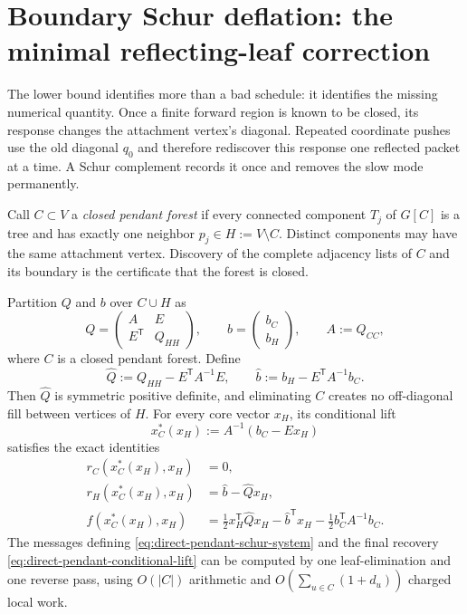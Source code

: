 \section{Boundary Schur deflation: the minimal reflecting-leaf correction}
\label{sec:direct-boundary-deflation}

The lower bound identifies more than a bad schedule: it identifies the
missing numerical quantity.  Once a finite forward region is known to be
closed, its response changes the attachment vertex's diagonal.  Repeated
coordinate pushes use the old diagonal $q_0$ and therefore rediscover this
response one reflected packet at a time.  A Schur complement records it
once and removes the slow mode permanently.

Call $C\subset V$ a \emph{closed pendant forest} if every connected
component $T_j$ of $G[C]$ is a tree and has exactly one neighbor
$p_j\in H:=V\setminus C$.  Distinct components may have the same attachment
vertex.  Discovery of the complete adjacency lists of $C$ and its boundary
is the certificate that the forest is closed.

\begin{theorem}
\label{thm:direct-pendant-deflation}
Partition $Q$ and $b$ over $C\cup H$ as
\begin{equation*}
 Q=\begin{pmatrix}A&E\\ E^\mathsf T&Q_{HH}\end{pmatrix},
 \qquad
 b=\begin{pmatrix}b_C\\b_H\end{pmatrix},
 \qquad A:=Q_{CC},
\end{equation*}
where $C$ is a closed pendant forest.  Define
\begin{equation}
 \widehat Q:=Q_{HH}-E^\mathsf TA^{-1}E,
 \qquad
 \widehat b:=b_H-E^\mathsf TA^{-1}b_C.
 \label{eq:direct-pendant-schur-system}
\end{equation}
Then $\widehat Q$ is symmetric positive definite, and eliminating $C$
creates no off-diagonal fill between vertices of $H$.  For every core vector
$x_H$, its conditional lift
\begin{equation}
 x_C^*(x_H):=A^{-1}(b_C-Ex_H)
 \label{eq:direct-pendant-conditional-lift}
\end{equation}
satisfies the exact identities
\begin{align}
 r_C(x_C^*(x_H),x_H)&=0,\label{eq:direct-pendant-zero-residual}\\
 r_H(x_C^*(x_H),x_H)&=\widehat b-\widehat Qx_H,
 \label{eq:direct-pendant-reduced-residual}\\
 f(x_C^*(x_H),x_H)
 &=\frac12x_H^\mathsf T\widehat Qx_H-\widehat b^\mathsf Tx_H
   -\frac12b_C^\mathsf TA^{-1}b_C.
 \label{eq:direct-pendant-objective-identity}
\end{align}
The messages defining \cref{eq:direct-pendant-schur-system} and the final
recovery \cref{eq:direct-pendant-conditional-lift} can be computed by one
leaf-elimination and one reverse pass, using $O(|C|)$ arithmetic and
$O(\sum_{u\in C}(1+d_u))$ charged local work.
\end{theorem}


